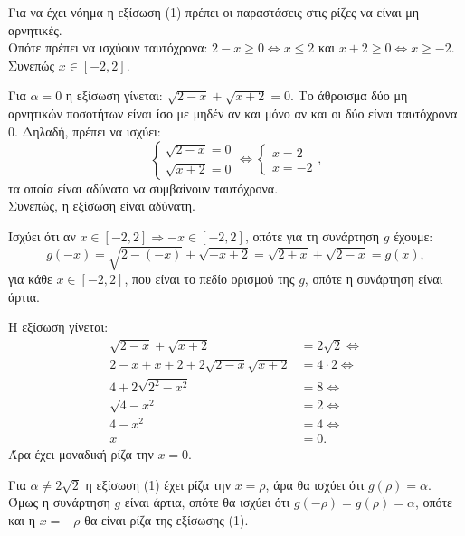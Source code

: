 \documentclass[11pt,a4paper,twoside]{book}
\begin{document}
\begin{alist}
\item Για να έχει νόημα η εξίσωση (1) πρέπει οι παραστάσεις στις ρίζες να είναι μη αρνητικές. \\
Οπότε πρέπει να ισχύουν ταυτόχρονα: $2 - x \ge 0 \Leftrightarrow x \le 2$ και $x + 2 \ge 0 \Leftrightarrow x \ge -2$. \\
Συνεπώς $x \in [-2, 2]$.
\item Για $\alpha = 0$ η εξίσωση γίνεται: $\sqrt{2-x} + \sqrt{x+2} = 0$. Το άθροισμα δύο μη αρνητικών ποσοτήτων είναι ίσο με μηδέν αν και μόνο αν και οι δύο είναι ταυτόχρονα $0$. Δηλαδή, πρέπει να ισχύει:
\[\begin{cases} \sqrt{2-x} = 0 \\ \sqrt{x+2} = 0 \end{cases} \Leftrightarrow \begin{cases} x = 2 \\ x = -2 \end{cases},\]
τα οποία είναι αδύνατο να συμβαίνουν ταυτόχρονα. \\
Συνεπώς, η εξίσωση είναι αδύνατη.
\item Ισχύει ότι αν $x \in [-2, 2] \Rightarrow -x \in [-2, 2]$, οπότε για τη συνάρτηση $g$ έχουμε:
\[g(-x) = \sqrt{2 - (-x)} + \sqrt{-x + 2} = \sqrt{2+x} + \sqrt{2-x} = g(x),\]
για κάθε $x \in [-2, 2]$, που είναι το πεδίο ορισμού της $g$, οπότε η συνάρτηση είναι άρτια.
\item 
\begin{rlist}
\item Η εξίσωση γίνεται:
\begin{align*}
\sqrt{2-x} + \sqrt{x+2} &= 2\sqrt{2} \Leftrightarrow \\ 
2 - x + x + 2 + 2\sqrt{2-x}\sqrt{x+2} &= 4\cdot 2 \Leftrightarrow \\
4 + 2\sqrt{2^2 - x^2} &= 8 \Leftrightarrow \\ 
\sqrt{4-x^2} &= 2 \Leftrightarrow \\ 
4 - x^2 &= 4 \Leftrightarrow \\ 
x &= 0.
\end{align*}
Άρα έχει μοναδική ρίζα την $x = 0$.
\item Για $\alpha \neq 2\sqrt{2}$ η εξίσωση (1) έχει ρίζα την $x = \rho$, άρα θα ισχύει ότι $g(\rho) = \alpha$. Όμως η συνάρτηση $g$ είναι άρτια, οπότε θα ισχύει ότι $g(-\rho) = g(\rho) = \alpha$, οπότε και η $x = -\rho$ θα είναι ρίζα της εξίσωσης (1).
\end{rlist}
\end{alist}
\end{document}
